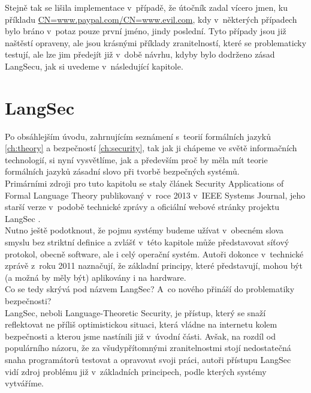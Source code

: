 Stejně tak se lišila implementace v~případě, že útočník zadal vícero jmen, ku příkladu \url{CN=www.paypal.com/CN=www.evil.com}, kdy v~některých 
případech bylo bráno v~potaz pouze první jméno, jindy poslední. Tyto případy jsou již naštěstí opraveny, ale jsou krásnými příklady zranitelností, 
které se problematicky testují, ale lze jim předejít již v~době návrhu, kdyby bylo dodrženo zásad LangSecu, jak si uvedeme v~následující kapitole.\\

\chapter{LangSec}\label{ch:langsec}
Po obsáhlejším úvodu, zahrnujícím seznámení s~teorií formálních jazyků \ref{ch:theory} a bezpečností \ref{ch:security}, tak jak ji chápeme ve světě 
informačních technologií, si nyní vysvětlíme, jak a především proč by měla mít teorie formálních jazyků zásadní slovo při tvorbě bezpečných systémů. \\

Primárními zdroji pro tuto kapitolu se staly článek Security Applications of Formal Language Theory \cite{Sass2013} publikovaný v~roce 2013 v~IEEE 
Systems Journal, jeho starší verze v~podobě technické zprávy \cite{Sass2011} a oficiální webové stránky projektu LangSec \cite{LangSecWeb}. \\

Nutno ještě podotknout, že pojmu systémy budeme užívat v~obecném slova smyslu bez striktní definice a zvlášť v~této kapitole může představovat 
síťový protokol, obecně software, ale i celý operační systém. Autoři dokonce v~technické zprávě z~roku 2011 \cite[str. 23]{Sass2011} naznačují, 
že základní principy, které představují, mohou být (a možná by měly být) aplikovány i na hardware. \\

Co se tedy skrývá pod názvem LangSec? A~co nového přináší do problematiky bezpečnosti? \\

LangSec, neboli Language-Theoretic Security, je přístup, který se snaží reflektovat ne příliš optimistickou situaci, která vládne na internetu kolem 
bezpečnosti a kterou jsme nastínili již v~úvodní části. Avšak, na rozdíl od populárního názoru, že za všudypřítomnými zranitelnostmi stojí 
nedostatečná snaha programátorů testovat a opravovat svoji práci, autoři přístupu LangSec vidí zdroj problému již v~základních principech, 
podle kterých systémy vytváříme. \\


